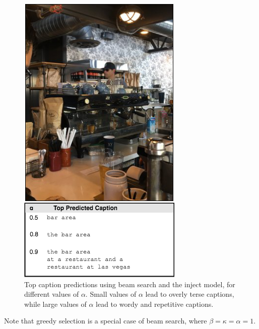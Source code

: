 \documentclass[letterpaper, 10 pt, conference]{ieeeconf}
\begin{document}
\begin{figure}[h]
\centering
\includegraphics[width=.6\linewidth]{alpha_affect}
\caption{Top caption predictions using beam search and the inject model, for different values of $\alpha$. Small values of $\alpha$ lead to overly terse captions, while large values of $\alpha$ lead to wordy and repetitive captions.}
\label{fig:test1}
\end{figure}

Note that greedy selection is a special case of beam search, where $\beta = \kappa = \alpha = 1$.  




\end{document}
